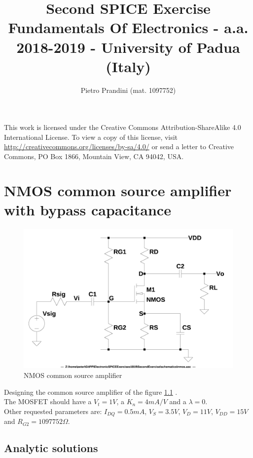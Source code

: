 \documentclass[10pt,a4paper]{book}
\title{Second SPICE Exercise\\{\small{Fundamentals Of Electronics - a.a. 2018-2019 -
University of Padua (Italy)}}}
\author{Pietro Prandini (mat. 1097752)}
\begin{document}
\maketitle

\vspace*{\fill}
\begin{center}
\tiny{This work is licensed under the Creative Commons Attribution-ShareAlike 4.0 International License. To view a copy of this license, visit \href{http://creativecommons.org/licenses/by-sa/4.0/}{http://creativecommons.org/licenses/by-sa/4.0/} or send a letter to Creative Commons, PO Box 1866, Mountain View, CA 94042, USA.}
\end{center}

\tableofcontents

\chapter{NMOS common source amplifier with bypass capacitance}
\begin{figure}[h]
  \centering
  \includegraphics[width=12cm]{schematics/nmos.jpg}
  \caption{NMOS common source amplifier}
  \label{nmos}
\end{figure}

Designing the common source amplifier of the figure \ref{nmos} .\\
The MOSFET should have a $V_t = 1V$, a $K_n = 4mA/V$ and a $\lambda = 0$.\\
Other requested parameters are: $I_{DQ} = 0.5mA$, $V_S = 3.5V$, $V_D = 11V$, $V_{DD} = 15V$ and $R_{G2} = 1097752\Omega$.\par

\section{Analytic solutions}
\end{document}
